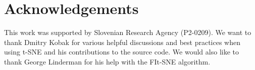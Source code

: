 \documentclass[letter]{article}
\begin{document}
\section*{Acknowledgements}
This work was supported by Slovenian Research Agency (P2-0209).
We want to thank Dmitry Kobak for various helpful discussions and best practices
when using t-SNE and his contributions to the source code. We would also
like to thank George Linderman for his help with the FIt-SNE algorithm.


\end{document}
